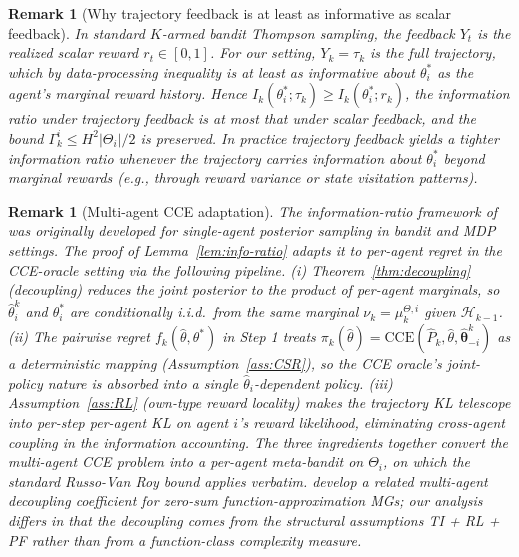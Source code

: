 \documentclass{article}
\newtheorem{remark}[theorem]{Remark}
\begin{document}
\begin{remark}[Why trajectory feedback is at least as informative as scalar feedback]
\label{rem:traj-feedback}
In standard $K$-armed bandit Thompson sampling, the feedback $Y_t$ is the realized scalar reward $r_t \in [0, 1]$. For our setting, $Y_k = \tau_k$ is the full trajectory, which by data-processing inequality is at least as informative about $\theta_i^*$ as the agent's marginal reward history. Hence $I_k(\theta_i^*; \tau_k) \geq I_k(\theta_i^*; r_k)$, the information ratio under trajectory feedback is at most that under scalar feedback, and the bound $\Gamma_k^i \leq H^2 |\Theta_i|/2$ is preserved. In practice trajectory feedback yields a tighter information ratio whenever the trajectory carries information about $\theta_i^*$ beyond marginal rewards (e.g., through reward variance or state visitation patterns).
\end{remark}

\begin{remark}[Multi-agent CCE adaptation]
\label{rem:multi-agent-cce}
The information-ratio framework of \citet{russo2016information} was originally developed for single-agent posterior sampling in bandit and MDP settings. The proof of Lemma~\ref{lem:info-ratio} adapts it to per-agent regret in the CCE-oracle setting via the following pipeline. (i) Theorem~\ref{thm:decoupling} (decoupling) reduces the joint posterior to the product of per-agent marginals, so $\hat\theta_i^k$ and $\theta_i^*$ are conditionally i.i.d.\ from the same marginal $\nu_k = \mu_k^{\Theta,i}$ given $\mathcal{H}_{k-1}$. (ii) The pairwise regret $f_k(\hat\theta, \theta^*)$ in Step 1 treats $\pi_k(\hat\theta) = \mathrm{CCE}(\hat P_k, \hat\theta, \hat{\boldsymbol\theta}_{-i}^k)$ as a deterministic mapping (Assumption~\ref{ass:CSR}), so the CCE oracle's joint-policy nature is absorbed into a single $\hat\theta_i$-dependent policy. (iii) Assumption~\ref{ass:RL} (own-type reward locality) makes the trajectory KL telescope into per-step per-agent KL on agent $i$'s reward likelihood, eliminating cross-agent coupling in the information accounting. The three ingredients together convert the multi-agent CCE problem into a per-agent meta-bandit on $\Theta_i$, on which the standard Russo-Van Roy bound applies verbatim. \citet{xiong2022self} develop a related multi-agent decoupling coefficient for zero-sum function-approximation MGs; our analysis differs in that the decoupling comes from the structural assumptions TI + RL + PF rather than from a function-class complexity measure.
\end{remark}
\end{document}

